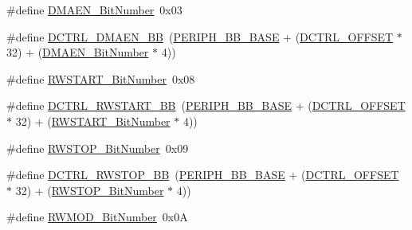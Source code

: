 \begin{DoxyCompactItemize}
\item 
\#define \hyperlink{group___s_d_i_o___private___types_definitions_gab2af311e327213503f0dbf3d013b7944}{D\+M\+A\+E\+N\+\_\+\+Bit\+Number}~0x03
\item 
\#define \hyperlink{group___s_d_i_o___private___types_definitions_ga43f7336d4f955c6cf1f676ccbc043fe9}{D\+C\+T\+R\+L\+\_\+\+D\+M\+A\+E\+N\+\_\+\+BB}~(\hyperlink{openmotestm_2library_2inc_2stm32f10x__map_8h_aed7efc100877000845c236ccdc9e144a}{P\+E\+R\+I\+P\+H\+\_\+\+B\+B\+\_\+\+B\+A\+SE} + (\hyperlink{openmotestm_2library_2src_2stm32f10x__sdio_8c_a948c1382c4cfd3af3e406c4d0cdd4240}{D\+C\+T\+R\+L\+\_\+\+O\+F\+F\+S\+ET} $\ast$ 32) + (\hyperlink{openmotestm_2library_2src_2stm32f10x__sdio_8c_ab2af311e327213503f0dbf3d013b7944}{D\+M\+A\+E\+N\+\_\+\+Bit\+Number} $\ast$ 4))
\item 
\#define \hyperlink{group___s_d_i_o___private___types_definitions_ga773045c51d3e8daee0c181517c44a2df}{R\+W\+S\+T\+A\+R\+T\+\_\+\+Bit\+Number}~0x08
\item 
\#define \hyperlink{group___s_d_i_o___private___types_definitions_gac776c39dfac0e1ed007217133e1145c3}{D\+C\+T\+R\+L\+\_\+\+R\+W\+S\+T\+A\+R\+T\+\_\+\+BB}~(\hyperlink{openmotestm_2library_2inc_2stm32f10x__map_8h_aed7efc100877000845c236ccdc9e144a}{P\+E\+R\+I\+P\+H\+\_\+\+B\+B\+\_\+\+B\+A\+SE} + (\hyperlink{openmotestm_2library_2src_2stm32f10x__sdio_8c_a948c1382c4cfd3af3e406c4d0cdd4240}{D\+C\+T\+R\+L\+\_\+\+O\+F\+F\+S\+ET} $\ast$ 32) + (\hyperlink{openmotestm_2library_2src_2stm32f10x__sdio_8c_a773045c51d3e8daee0c181517c44a2df}{R\+W\+S\+T\+A\+R\+T\+\_\+\+Bit\+Number} $\ast$ 4))
\item 
\#define \hyperlink{group___s_d_i_o___private___types_definitions_gae8c0654ad5cba23281bcfa77ef19b9cf}{R\+W\+S\+T\+O\+P\+\_\+\+Bit\+Number}~0x09
\item 
\#define \hyperlink{group___s_d_i_o___private___types_definitions_ga678da1db835676b0fb1976cf3408e2d1}{D\+C\+T\+R\+L\+\_\+\+R\+W\+S\+T\+O\+P\+\_\+\+BB}~(\hyperlink{openmotestm_2library_2inc_2stm32f10x__map_8h_aed7efc100877000845c236ccdc9e144a}{P\+E\+R\+I\+P\+H\+\_\+\+B\+B\+\_\+\+B\+A\+SE} + (\hyperlink{openmotestm_2library_2src_2stm32f10x__sdio_8c_a948c1382c4cfd3af3e406c4d0cdd4240}{D\+C\+T\+R\+L\+\_\+\+O\+F\+F\+S\+ET} $\ast$ 32) + (\hyperlink{openmotestm_2library_2src_2stm32f10x__sdio_8c_ae8c0654ad5cba23281bcfa77ef19b9cf}{R\+W\+S\+T\+O\+P\+\_\+\+Bit\+Number} $\ast$ 4))
\item 
\#define \hyperlink{group___s_d_i_o___private___types_definitions_gad7b722671f65e79d1be2899b643278ad}{R\+W\+M\+O\+D\+\_\+\+Bit\+Number}~0x0A

\end{DoxyCompactItemize}

